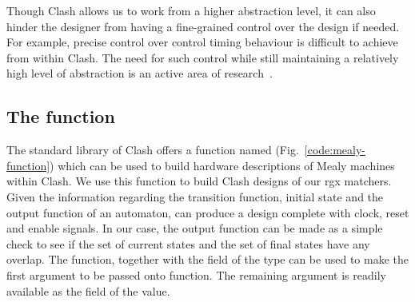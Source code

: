 Though Clash allows us to work from a higher abstraction level, it can
also hinder the designer from having a fine-grained control over the
design if needed.
For example, precise control over control timing behaviour is
difficult to achieve from within Clash.
The need for such control while still maintaining a relatively high
level of abstraction is an active area of
research~\cite{nigam2023modular}.

%

\subsection{The  function}
The standard library of Clash offers a function named 
(Fig.~\ref{code:mealy-function}) which can be used to build hardware
descriptions of Mealy machines within Clash.
We use this function to build Clash designs of our \gls{rgx} matchers.
%
Given the information regarding the transition function, initial state
and the output function of an automaton,  can produce a
design complete with clock, reset and enable signals.
%
In our case, the output function can be made as a simple check to see
if the set of current states and the set of final states have any
overlap.
The  function, together with the  field of the
 type can be used to make the first argument to be passed
onto  function.
The remaining argument is readily available as the  field
of the  value.

